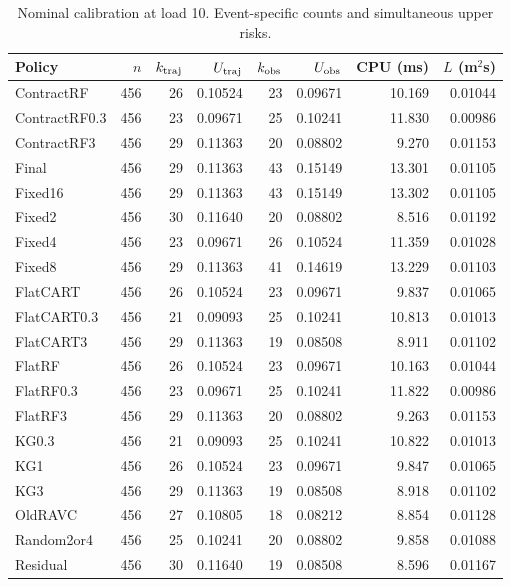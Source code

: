 \begin{table}[!htbp]\centering\footnotesize
\caption{Nominal calibration at load 10. Event-specific counts and simultaneous upper risks.}\label{supp:calnominal_calibration10}
\begin{tabular}{@{}lrrrrrrr@{}}\toprule
Policy & $n$ & $k_{\rm traj}$ & $U_{\rm traj}$ & $k_{\rm obs}$ & $U_{\rm obs}$ & CPU (ms) & $L$ (m$^2$s)\\\midrule
ContractRF & 456 & 26 & 0.10524 & 23 & 0.09671 & 10.169 & 0.01044\\
ContractRF0.3 & 456 & 23 & 0.09671 & 25 & 0.10241 & 11.830 & 0.00986\\
ContractRF3 & 456 & 29 & 0.11363 & 20 & 0.08802 & 9.270 & 0.01153\\
Final & 456 & 29 & 0.11363 & 43 & 0.15149 & 13.301 & 0.01105\\
Fixed16 & 456 & 29 & 0.11363 & 43 & 0.15149 & 13.302 & 0.01105\\
Fixed2 & 456 & 30 & 0.11640 & 20 & 0.08802 & 8.516 & 0.01192\\
Fixed4 & 456 & 23 & 0.09671 & 26 & 0.10524 & 11.359 & 0.01028\\
Fixed8 & 456 & 29 & 0.11363 & 41 & 0.14619 & 13.229 & 0.01103\\
FlatCART & 456 & 26 & 0.10524 & 23 & 0.09671 & 9.837 & 0.01065\\
FlatCART0.3 & 456 & 21 & 0.09093 & 25 & 0.10241 & 10.813 & 0.01013\\
FlatCART3 & 456 & 29 & 0.11363 & 19 & 0.08508 & 8.911 & 0.01102\\
FlatRF & 456 & 26 & 0.10524 & 23 & 0.09671 & 10.163 & 0.01044\\
FlatRF0.3 & 456 & 23 & 0.09671 & 25 & 0.10241 & 11.822 & 0.00986\\
FlatRF3 & 456 & 29 & 0.11363 & 20 & 0.08802 & 9.263 & 0.01153\\
KG0.3 & 456 & 21 & 0.09093 & 25 & 0.10241 & 10.822 & 0.01013\\
KG1 & 456 & 26 & 0.10524 & 23 & 0.09671 & 9.847 & 0.01065\\
KG3 & 456 & 29 & 0.11363 & 19 & 0.08508 & 8.918 & 0.01102\\
OldRAVC & 456 & 27 & 0.10805 & 18 & 0.08212 & 8.854 & 0.01128\\
Random2or4 & 456 & 25 & 0.10241 & 20 & 0.08802 & 9.858 & 0.01088\\
Residual & 456 & 30 & 0.11640 & 19 & 0.08508 & 8.596 & 0.01167\\
\bottomrule\end{tabular}\end{table}

